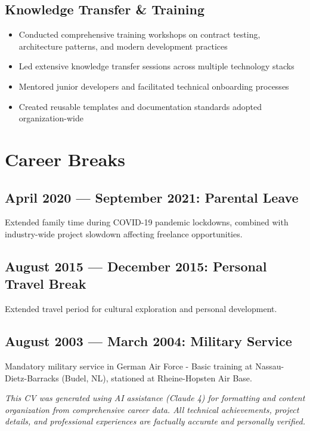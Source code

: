 \documentclass[11pt,a4paper]{article}
\begin{document}
\subsection{Knowledge Transfer \& Training}
\begin{itemize}[leftmargin=12pt,topsep=0pt,itemsep=0pt]
\item Conducted comprehensive training workshops on contract testing, architecture patterns, and modern development practices
\item Led extensive knowledge transfer sessions across multiple technology stacks
\item Mentored junior developers and facilitated technical onboarding processes
\item Created reusable templates and documentation standards adopted organization-wide
\end{itemize}

\section{Career Breaks}

\subsection{April 2020 — September 2021: Parental Leave}
Extended family time during COVID-19 pandemic lockdowns, combined with industry-wide project slowdown affecting freelance opportunities.

\subsection{August 2015 — December 2015: Personal Travel Break}
Extended travel period for cultural exploration and personal development.

\subsection{August 2003 — March 2004: Military Service}
Mandatory military service in German Air Force - Basic training at Nassau-Dietz-Barracks (Budel, NL), stationed at Rheine-Hopsten Air Base.

\vspace{1cm}

\footnotesize
\textit{This CV was generated using AI assistance (Claude 4) for formatting and content organization from comprehensive career data. All technical achievements, project details, and professional experiences are factually accurate and personally verified.}
\end{document}
